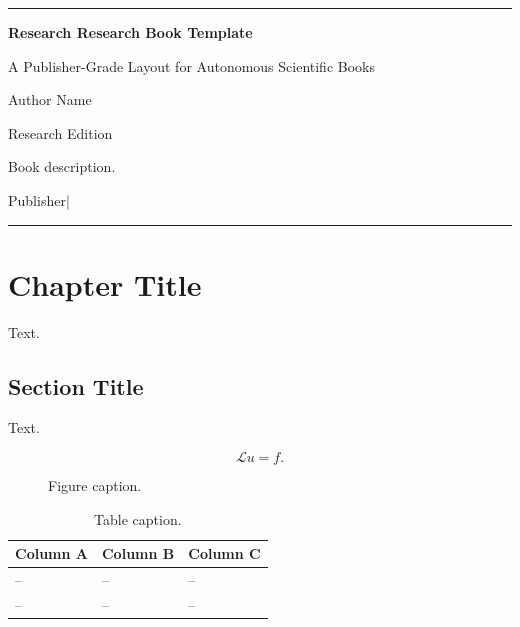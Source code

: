 \documentclass[11pt,a4paper,openany]{book}
\newcommand{\BookTitle}{Research Research Book Template}
\newcommand{\BookSubtitle}{A Publisher-Grade Layout for Autonomous Scientific Books}
\newcommand{\BookAuthor}{Author Name}
\newcommand{\BookPublisher}{Publisher}
\newcommand{\BookEdition}{Research Edition}
\newcommand{\BookDate}{2026}
\newcommand{\BookDescription}{Book description.}
\theoremstyle{bookplain}
\theoremstyle{bookdefinition}
\theoremstyle{remark}
\newcommand{\MakeResearchBookTitle}{%
\begin{titlepage}
\centering
\vspace*{12mm}
{\color{BookAccent}\rule{\textwidth}{1.1pt}}\par
\vspace{24mm}
{\sffamily\bfseries\fontsize{30}{34}\selectfont\color{BookBlue}\BookTitle\par}
\vspace{8mm}
{\sffamily\Large\color{BookMuted}\BookSubtitle\par}
\vspace{18mm}
{\Large\BookAuthor\par}
\vspace{8mm}
{\sffamily\normalsize\color{BookAccent}\BookEdition\par}
\vfill
\begin{minipage}{0.72\textwidth}
\centering
\small\color{BookMuted}\BookDescription
\end{minipage}
\vfill
{\sffamily\small \BookPublisher\quad|\quad \BookDate\par}
\vspace{8mm}
{\color{BookAccent}\rule{0.52\textwidth}{0.75pt}}\par
\end{titlepage}}
\begin{document}
\frontmatter
\MakeResearchBookTitle
\tableofcontents

\mainmatter


\chapter{Chapter Title}

Text.

\section{Section Title}

Text.

\begin{equation}
  \mathcal{L}u = f .
\end{equation}

\begin{figure}[htbp]
\centering
\fbox{\rule{0pt}{1.8in}\rule{0.85\textwidth}{0pt}}
\caption{Figure caption.}
\end{figure}

\begin{table}[htbp]
\caption{Table caption.}
\begin{tabularx}{\textwidth}{YYY}
\toprule
Column A & Column B & Column C \\
\midrule
-- & -- & -- \\
-- & -- & -- \\
\bottomrule
\end{tabularx}
\end{table}

\backmatter

\end{document}

